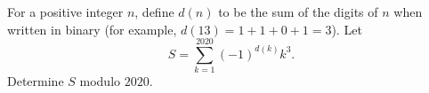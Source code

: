 For a positive integer $n$, define $d(n)$ to be the sum of the digits of $n$ when written in binary (for example, $d(13)=1+1+0+1=3$). Let
\[
S=\sum_{k=1}^{2020}(-1)^{d(k)}k^3.
\]Determine $S$ modulo $2020$.